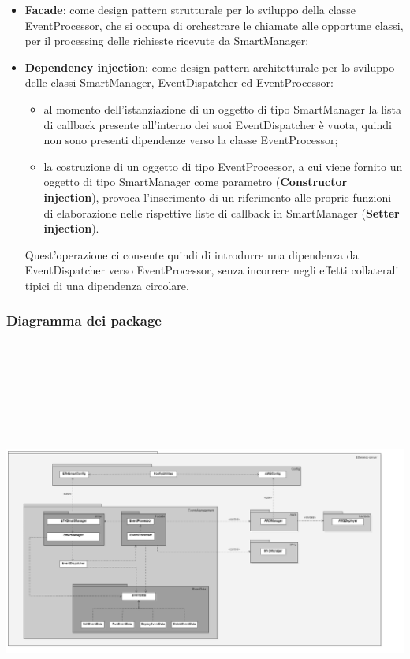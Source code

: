 \begin{itemize}
	\item \textbf{Facade}: come design pattern strutturale per lo sviluppo della classe EventProcessor, che si occupa di orchestrare le chiamate alle opportune classi, per il processing delle richieste ricevute da SmartManager;
	\item \textbf{Dependency injection}: come design pattern architetturale per lo sviluppo delle classi SmartManager, EventDispatcher ed EventProcessor:
	\begin{itemize}
		\item al momento dell'istanziazione di un oggetto di tipo SmartManager la lista di callback presente all'interno dei suoi EventDispatcher è vuota, quindi non sono presenti dipendenze verso la classe EventProcessor;
		\item la costruzione di un oggetto di tipo EventProcessor, a cui viene fornito un oggetto di tipo SmartManager come parametro (\textbf{Constructor injection}), provoca l'inserimento di un riferimento alle proprie funzioni di elaborazione nelle rispettive liste di callback in SmartManager (\textbf{Setter injection}).
	\end{itemize}
	Quest'operazione ci consente quindi di introdurre una dipendenza da EventDispatcher verso EventProcessor, senza incorrere negli effetti collaterali tipici di una dipendenza circolare.
\end{itemize}
\begin{landscape}
\subsubsection{Diagramma dei package}
	\includegraphics[width=24cm, height=14cm]{././diagrammi/etherless-server/Etherless-server-package.png}
\end{landscape}
